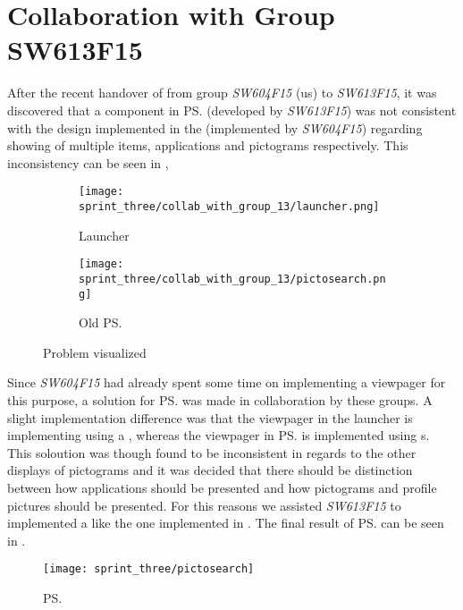
\section{Collaboration with Group SW613F15}
\label{sec:collaboration_with_group_sw613f15}

After the recent handover of \gc from group \emph{SW604F15} (us) to \emph{SW613F15}, it was discovered that a component in \ps (developed by \emph{SW613F15}) was not consistent with the design implemented in the \launcher (implemented by \emph{SW604F15}) regarding showing of multiple items, applications and pictograms respectively. This inconsistency can be seen in , 

\begin{figure}[!htbp]
    \centering

    \begin{subfigure}[t]{0.4\textwidth}
        \texttt{[image: sprint\_three/collab\_with\_group\_13/launcher.png]}
        \caption{Launcher}
        \label{fig:collab_with_group_13_launhcer}
    \end{subfigure}
    \hspace{5em} 
    \begin{subfigure}[t]{0.4\textwidth}
        \texttt{[image: sprint\_three/collab\_with\_group\_13/pictosearch.png]}
        \caption{Old \ps}
        \label{fig:collab_with_group_13_pictosearch}
    \end{subfigure}
    
    \caption{Problem visualized}
    \label{fig:collab_with_group_13}
\end{figure}

Since \emph{SW604F15} had already spent some time on implementing a viewpager for this purpose, a solution for \ps was made in collaboration by these groups. A slight implementation difference was that the viewpager in the launcher is implementing using a , whereas the viewpager in \ps is implemented using s. This soloution was though found to be inconsistent in regards to the other displays of pictograms and it was decided that there should be distinction between how applications should be presented and how pictograms and profile pictures should be presented. For this reasons we assisted \emph{SW613F15} to implemented a  like the one implemented in \ct. The final result of \ps can be seen in .


\begin{figure}[!htbp]
    \centering
    \texttt{[image: sprint\_three/pictosearch]}
    \caption{\ps}
    \label{fig:pictosearch}
\end{figure}
